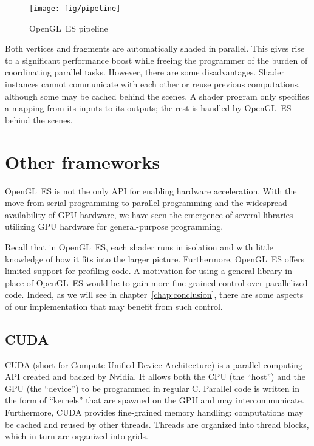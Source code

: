 \documentclass[english,12pt]{ifimaster}
\begin{document}
\begin{figure}
  \centering
  \texttt{[image: fig/pipeline]}
  \caption{OpenGL~ES pipeline}
  \label{fig:pipeline}
\end{figure}

Both vertices and fragments are automatically shaded in parallel. This
gives rise to a significant performance boost while freeing the
programmer of the burden of coordinating parallel tasks. However,
there are some disadvantages. Shader instances cannot communicate with
each other or reuse previous computations, although some may be cached
behind the scenes. A shader program only specifies a mapping from its
inputs to its outputs; the rest is handled by OpenGL~ES behind the
scenes.

\section{Other frameworks}

OpenGL~ES is not the only API for enabling hardware acceleration. With
the move from serial programming to parallel programming and the
widespread availability of GPU hardware, we have seen the emergence of
several libraries utilizing GPU hardware for general-purpose
programming.

Recall that in OpenGL~ES, each shader runs in isolation and with little
knowledge of how it fits into the larger picture. Furthermore, OpenGL~ES
offers limited support for profiling code. A motivation for using a
general library in place of OpenGL~ES would be to gain more fine-grained
control over parallelized code. Indeed, as we will see in
chapter~\ref{chap:conclusion}, there are some aspects of our
implementation that may benefit from such control.



\subsection{CUDA}


CUDA (short for Compute Unified Device Architecture) is a parallel
computing API created and backed by Nvidia. It allows both the CPU
(the ``host'') and the GPU (the ``device'') to be programmed in
regular C. Parallel code is written in the form of ``kernels'' that
are spawned on the GPU and may intercommunicate. Furthermore, CUDA
provides fine-grained memory handling: computations may be cached and
reused by other threads. Threads are organized into thread blocks,
which in turn are organized into grids.
\end{document}
